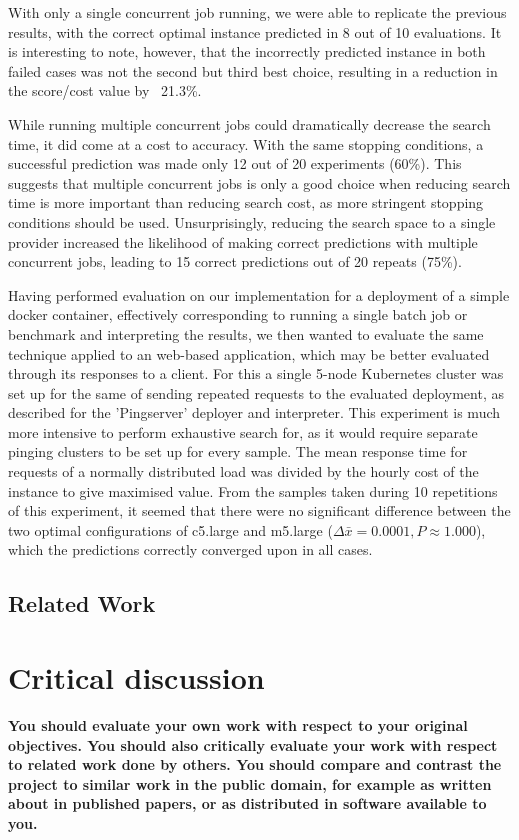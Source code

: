 \documentclass{article}
\begin{document}
With only a single concurrent job running, we were able to replicate the previous results, with the correct optimal instance predicted in 8 out of 10 evaluations. It is interesting to note, however, that the incorrectly predicted instance in both failed cases was not the second but third best choice, resulting in a reduction in the score/cost value by ~21.3\%.

While running multiple concurrent jobs could dramatically decrease the search time, it did come at a cost to accuracy. With the same stopping conditions, a successful prediction was made only 12 out of 20 experiments (60\%). This suggests that multiple concurrent jobs is only a good choice when reducing search time is more important than reducing search cost, as more stringent stopping conditions should be used.  Unsurprisingly, reducing the search space to a single provider increased the likelihood of making correct predictions with multiple concurrent jobs, leading to 15 correct predictions out of 20 repeats (75\%).

Having performed evaluation on our implementation for a deployment of a simple docker container, effectively corresponding to running a single batch job or benchmark and interpreting the results, we then wanted to evaluate the same technique applied to an web-based application, which may be better evaluated through its responses to a client. For this a single 5-node Kubernetes cluster was set up for the same of sending repeated requests to the evaluated deployment, as described for the 'Pingserver' deployer and interpreter. This experiment is much more intensive to perform exhaustive search for, as it would require separate pinging clusters to be set up for every sample. The mean response time for requests of a normally distributed load was divided by the hourly cost of the instance to give maximised value. From the samples taken during 10 repetitions of this experiment, it seemed that there were no significant difference between the two optimal configurations of c5.large and m5.large ($\Delta \bar{x}=0.0001, P \approx 1.000$), which the predictions correctly converged upon in all cases.

\subsection{Related Work}


\section{Critical discussion}
\textbf{You should evaluate your own work with respect to your
original objectives. You should also critically evaluate
your work with respect to related work done by others.
You should compare and contrast the project to similar
work in the public domain, for example as written about
in published papers, or as distributed in software available to you. }
\end{document}
